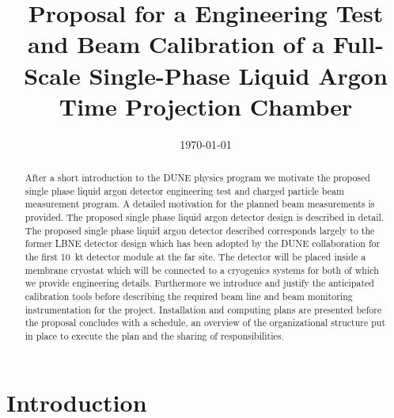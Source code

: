 \documentclass[12pt]{article}
\begin{document}
\linenumbers

\title{  Proposal for a Engineering Test and Beam Calibration of a Full-Scale Single-Phase Liquid Argon Time Projection Chamber}

\date{\today}
	

\maketitle




\begin{abstract}

After a short introduction to the DUNE physics program we motivate the proposed single phase liquid argon detector engineering test and charged particle beam measurement program. A detailed motivation for the planned beam measurements is provided. The proposed
single phase liquid argon detector design is described in detail. 
The proposed single phase liquid argon detector described corresponds largely to the former LBNE detector design which has been adopted by the DUNE collaboration for the first 10~kt detector module at the far site.
The detector will be placed inside a membrane cryostat which will be connected to a cryogenics systems for both of which we provide engineering details. 
Furthermore we introduce and justify the anticipated calibration tools before 
describing the required beam line and beam monitoring instrumentation for the project.
Installation and computing plans are presented before
the proposal concludes with a schedule, an overview of the organizational structure put in place to execute the plan and 
the sharing of responsibilities.


\end{abstract}

\newpage
\tableofcontents

\newpage

\section{Introduction}
	
%	
\end{document}
